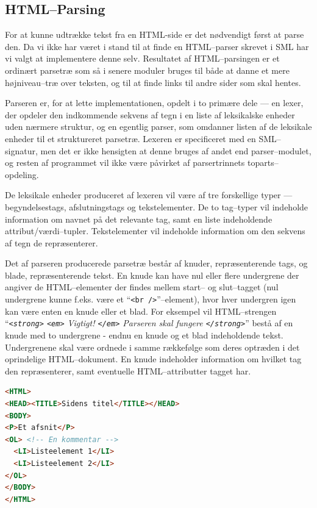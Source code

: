 \documentclass[a4paper,oneside,article]{memoir}
\begin{document}
\subsection{HTML--Parsing}
For at kunne udtrække tekst fra en HTML-side er det nødvendigt først
at parse den. Da vi ikke har været i stand til at finde en HTML--parser
skrevet i SML har vi valgt at implementere denne selv. Resultatet af
HTML--parsingen er et ordinært parsetræ som så i senere moduler bruges
til både at danne et mere højniveau--træ over teksten, og til at finde
links til andre sider som skal hentes.

Parseren er, for at lette implementationen, opdelt i to primære dele ---
en lexer, der opdeler den indkommende sekvens af tegn i en liste af
leksikalske enheder uden nærmere struktur, og en egentlig parser, som
omdanner listen af de leksikale enheder til et struktureret
parsetræ. Lexeren er specificeret med en SML--signatur, men det er ikke
hensigten at denne bruges af andet end parser--modulet, og resten af
programmet vil ikke være påvirket af parsertrinnets toparts--opdeling.

De leksikale enheder produceret af lexeren vil være af tre forskellige
typer --- begyndelsestags, afslutningstags og tekstelementer. De to
tag--typer vil indeholde information om navnet på det relevante tag,
samt en liste indeholdende attribut/værdi--tupler. Tekstelementer vil
indeholde information om den sekvens af tegn de repræsenterer.

Det af parseren producerede parsetræ består af knuder, repræsenterende
tags, og blade, repræsenterende tekst. En knude kan have nul eller
flere undergrene der angiver de HTML--elementer der findes mellem
start-- og slut--tagget (nul undergrene kunne f.eks. være et
``\texttt{<br />}''--element), hvor hver undergren igen kan være enten
en knude eller et blad. For eksempel vil HTML--strengen
``\textit{\texttt{<strong>} \texttt{<em>} Vigtigt! \texttt{</em>} 
  Parseren skal fungere \texttt{</strong>}}'' bestå af en knude med to
undergrene - endnu en knude og et blad indeholdende
tekst. Undergrenene skal være ordnede i samme rækkefølge som deres
optræden i det oprindelige HTML--dokument. En knude indeholder
information om hvilket tag den repræsenterer, samt eventuelle
HTML--attributter tagget har.

\begin{lstlisting}[language=HTML]
<HTML>
<HEAD><TITLE>Sidens titel</TITLE></HEAD>
<BODY>
<P>Et afsnit</P>
<OL> <!-- En kommentar -->
  <LI>Listeelement 1</LI>
  <LI>Listeelement 2</LI>
</OL>
</BODY>
</HTML>
\end{lstlisting}
\end{document}
